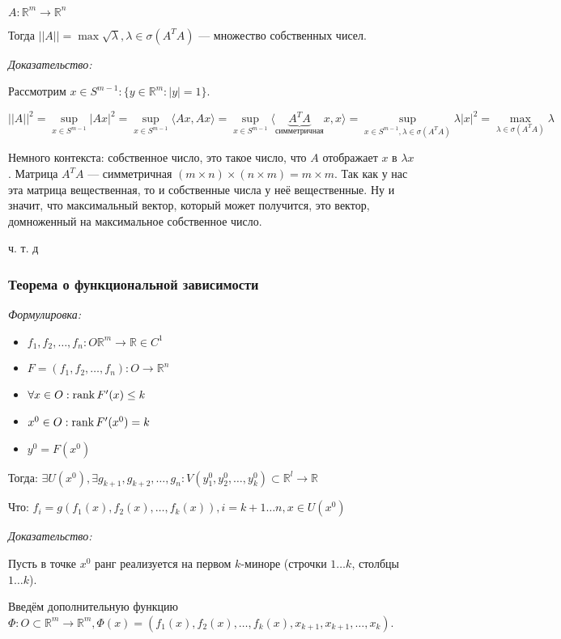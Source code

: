 \documentclass{article}
\begin{document}
$A: \mathbb{R}^m \rightarrow \mathbb{R}^n$

Тогда $||A|| = \max {\sqrt{\lambda}}, \lambda \in \sigma(A^TA)$ --- множество собственных чисел. 

\textit{Доказательство:}

Рассмотрим $x \in S^{m - 1}: \{y \in \mathbb{R}^m: |y| = 1\}$.

\[||A||^2 = \sup_{x \in S^{m - 1}}|Ax|^2 = \sup_{x \in S^{m - 1}}\langle Ax, Ax \rangle = \sup_{x \in S^{m - 1}}\langle \underbrace{A^TA}_{\text{симметричная}}x, x \rangle = \sup_{x \in S^{m - 1}, \lambda \in \sigma(A^TA)} \lambda |x|^2 = \max_{\lambda \in \sigma(A^TA)} \lambda\]

Немного контекста: собственное число, это такое число, что $A$ отображает $x$ в $\lambda x$. Матрица $A^TA$ --- симметричная $(m \times n) \times (n \times m) = m \times m$. Так как у нас эта матрица вещественная, то и собственные числа у неё вещественные. Ну и значит, что максимальный вектор, который может получится, это вектор, домноженный на максимальное собственное число.

ч. т. д

\subsubsection{Теорема о функциональной зависимости}
\textit{Формулировка:}

\begin{itemize}
    \item $f_1, f_2, \ldots, f_n: O \mathbb{R}^m \rightarrow \mathbb{R} \in C^1$
    \item $F = (f_1, f_2, \ldots, f_n): O \rightarrow \mathbb{R}^n$
    \item $\forall x \in O: \rank F'(x) \le k$
    \item $x^0 \in O: \rank F'(x^0) = k$
    \item $y^0 = F(x^0)$
\end{itemize}

Тогда: $\exists U(x^0), \exists g_{k + 1}, g_{k + 2}, \ldots, g_n: V(y^0_1, y^0_2, \ldots, y^0_k) \subset \mathbb{R}^l \rightarrow \mathbb{R}$

Что: $f_i = g(f_1(x), f_2(x), \ldots, f_k(x)), i = k + 1 \ldots n, x \in U(x^0)$

\textit{Доказательство:}

Пусть в точке $x^0$ ранг реализуется на первом $k$-миноре (строчки $1 \ldots k$, столбцы $1 \ldots k$).

Введём дополнительную функцию $\Phi: O \subset \mathbb{R}^m \rightarrow \mathbb{R}^m, \Phi(x) = (f_1(x), f_2(x), \ldots, f_k(x), x_{k + 1}, x_{k + 1}, \ldots, x_k)$.
\end{document}
